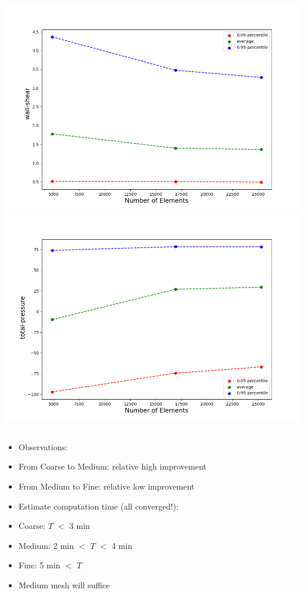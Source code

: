 \documentclass[11pt,t]{beamer}
\begin{document}
    \begin{frame}
            \begin{columns}
                \includegraphics[width=\textwidth]{wall-shear_MSA.png}
                \includegraphics[width=\textwidth]{total-pressure_MSA.png}
            \end{columns}
        \begin{itemize}
            \item<2->[] Observations:
            \item<3->[$\rightarrow$] From Coarse to Medium: relative high improvement
            \item<4->[$\rightarrow$] \alert<6->{From Medium to Fine: relative low improvement}
            \item<5->[$\rightarrow$] Estimate computation time (all \alert{converged}!): 
            \item<5->[] Coarse: $T$ $<$ 3 min
            \item<5->[] \alert<6->{Medium: 2 min $<$ $T$ $<$ 4 min }
            \item<5->[] Fine: 5 min $<$ $T$
            \item<7->[$\Rightarrow$] Medium mesh will suffice
        \end{itemize}
    \end{frame}
\end{document}
